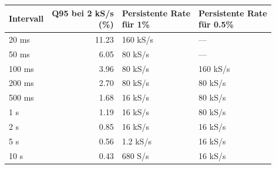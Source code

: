 \begin{tabular}{@{}lrll@{}}
\toprule
Intervall & \shortstack{Q95 bei 2 kS/s\\(\%)} & \shortstack{Persistente Rate \\ für 1\%} & \shortstack{Persistente Rate \\ für 0.5\%} \\
\midrule
20 ms & 11.23 & 160 kS/s & --- \\
50 ms & 6.05 & 80 kS/s & --- \\
100 ms & 3.96 & 80 kS/s & 160 kS/s \\
200 ms & 2.70 & 80 kS/s & 80 kS/s \\
500 ms & 1.68 & 16 kS/s & 80 kS/s \\
1 s & 1.19 & 16 kS/s & 80 kS/s \\
2 s & 0.85 & 16 kS/s & 16 kS/s \\
5 s & 0.56 & 1.2 kS/s & 16 kS/s \\
10 s & 0.43 & 680 S/s & 16 kS/s \\
\bottomrule
\end{tabular}
